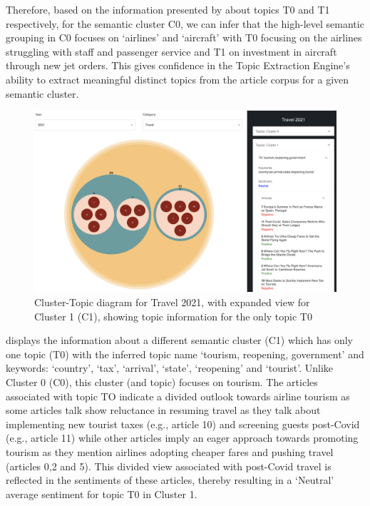 Therefore, based on the information presented by  about topics T0 and T1 respectively, for the semantic cluster C0, we can infer that the high-level semantic grouping in C0 focuses on `airlines' and `aircraft' with T0 focusing on the airlines struggling with staff and passenger service and T1 on investment in aircraft through new jet orders. This gives confidence in the Topic Extraction Engine's ability to extract meaningful distinct topics from the article corpus for a given semantic cluster. 


\begin{figure}[H]
  \centering
  \includegraphics[width=0.99\linewidth]{images/travel2021_topics_2.png}
  \caption{Cluster-Topic diagram for Travel 2021, with expanded view for Cluster 1 (C1), showing topic information for the only topic T0}
  \label{fig:topics2_travel2021}
\end{figure}

 displays the information about a different semantic cluster (C1) which has only one topic (T0) with the inferred topic name `tourism, reopening, government' and keywords: `country', `tax', `arrival', `state', `reopening' and `tourist'. Unlike Cluster 0 (C0), this cluster (and topic) focuses on tourism. The articles associated with topic TO indicate a divided outlook towards airline tourism as some articles talk show reluctance in resuming travel as they talk about implementing new tourist taxes (e.g., article 10) and screening guests post-Covid (e.g., article 11) while other articles imply an eager approach towards promoting tourism as they mention airlines adopting cheaper fares and pushing travel (articles 0,2 and 5). This divided view associated with post-Covid travel is reflected in the sentiments of these articles, thereby resulting in a `Neutral' average sentiment for topic T0 in Cluster 1.

